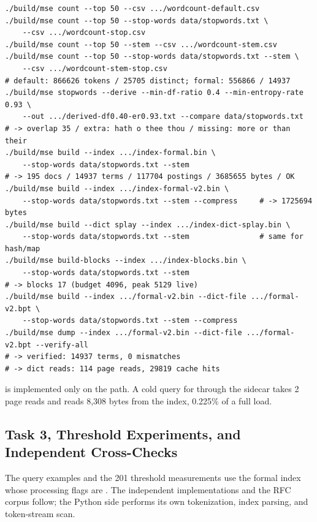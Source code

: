 \begin{lstlisting}[style=cli]
./build/mse count --top 50 --csv .../wordcount-default.csv
./build/mse count --top 50 --stop-words data/stopwords.txt \
    --csv .../wordcount-stop.csv
./build/mse count --top 50 --stem --csv .../wordcount-stem.csv
./build/mse count --top 50 --stop-words data/stopwords.txt --stem \
    --csv .../wordcount-stem-stop.csv
# default: 866626 tokens / 25705 distinct; formal: 556866 / 14937
./build/mse stopwords --derive --min-df-ratio 0.4 --min-entropy-rate 0.93 \
    --out .../derived-df0.40-er0.93.txt --compare data/stopwords.txt
# -> overlap 35 / extra: hath o thee thou / missing: more or than their
./build/mse build --index .../index-formal.bin \
    --stop-words data/stopwords.txt --stem
# -> 195 docs / 14937 terms / 117704 postings / 3685655 bytes / OK
./build/mse build --index .../index-formal-v2.bin \
    --stop-words data/stopwords.txt --stem --compress     # -> 1725694 bytes
./build/mse build --dict splay --index .../index-dict-splay.bin \
    --stop-words data/stopwords.txt --stem                # same for hash/map
./build/mse build-blocks --index .../index-blocks.bin \
    --stop-words data/stopwords.txt --stem
# -> blocks 17 (budget 4096, peak 5129 live)
./build/mse build --index .../formal-v2.bin --dict-file .../formal-v2.bpt \
    --stop-words data/stopwords.txt --stem --compress
./build/mse dump --index .../formal-v2.bin --dict-file .../formal-v2.bpt --verify-all
# -> verified: 14937 terms, 0 mismatches
# -> dict reads: 114 page reads, 29819 cache hits
\end{lstlisting}

\code{--verify-all} is implemented only on the  path. A cold
query for \code{banquo} through the sidecar takes 2 page reads and reads 8,308
bytes from the index, 0.225\% of a full load.

\subsection{Task 3, Threshold Experiments, and Independent Cross-Checks}

The query examples and the 201 threshold measurements use the formal index
whose processing flags are . The independent
implementations and the RFC corpus follow; the Python side performs its own
tokenization, index parsing, and token-stream scan.

